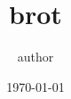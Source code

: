 \documentclass{article}
\title{ {{ brot }} }
\author{ {{ author }} }
\date{\today}
\begin{document}
\maketitle

\blindtext
\end{document}
